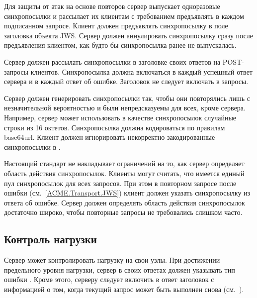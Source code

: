 Для защиты от атак на основе повторов сервер выпускает одноразовые синхропосылки
и рассылает их клиентам с требованием предъявлять в каждом подписанном запросе.
%
Клиент должен предъявлять синхропосылку в поле  заголовка объекта
JWS.
%
Сервер должен аннулировать синхропосылку сразу после предъявления клиентом, 
как будто бы синхропосылка ранее не выпускалась.

Сервер должен рассылать синхропосылки в заголовке  
своих ответов на POST-запросы клиентов. Синхропосылка должна включаться 
в каждый успешный ответ сервера и в каждый ответ об ошибке.
%
Заголовок  не следует включать в запросы.

Сервер должен генерировать синхропосылки так, чтобы они повторялись лишь с 
незначительной вероятностью и были непредсказуемы для всех, кроме сервера.
%
Например, сервер может использовать в качестве синхропосылок случайные строки 
из 16 октетов.
%
Синхропосылка должна кодироваться по правилам base64url.
%
Клиент должен игнорировать некорректно закодированные синхропосылки 
в .

Настоящий стандарт не накладывает ограничений на то, как сервер определяет 
область действия синхропосылок. Клиенты могут считать, что имеется единый пул 
синхропосылок для всех запросов.
%
При этом в повторном запросе после ошибки  
(см.~\ref{ACME.Transport.JWS}) клиент должен указать синхропосылку из ответа    
об ошибке.
%
Сервер должен определять область действия синхропосылок достаточно широко, 
чтобы повторные запросы не требовались слишком часто.

\subsection{Контроль нагрузки}\label{ACME.Transport.Limit}

Сервер может контролировать нагрузку на свои узлы. При достижении предельного 
уровня нагрузки, сервер в своих ответах должен указывать тип ошибки 
.
%
Кроме этого, серверу следует включить в ответ заголовок  с 
информацией о том, когда текущий запрос может быть выполнен снова 
(см.~\cite{HTTP}).



